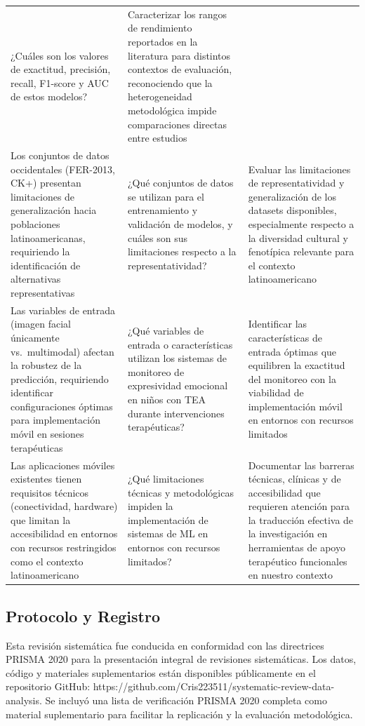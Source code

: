 \documentclass[3p,twocolumn,times]{elsarticle}
\begin{document}
\begin{longtable}{p{4cm} p{6cm} p{5cm}}
		¿Cuáles son los valores de exactitud, precisión, recall, F1-score y AUC de estos modelos? &
		Caracterizar los rangos de rendimiento reportados en la literatura para distintos contextos de evaluación, reconociendo que la heterogeneidad metodológica impide comparaciones directas entre estudios \\[4pt]
		Los conjuntos de datos occidentales (FER-2013, CK+) presentan limitaciones de generalización hacia poblaciones latinoamericanas, requiriendo la identificación de alternativas representativas &
		¿Qué conjuntos de datos se utilizan para el entrenamiento y validación de modelos, y cuáles son sus limitaciones respecto a la representatividad? &
		Evaluar las limitaciones de representatividad y generalización de los datasets disponibles, especialmente respecto a la diversidad cultural y fenotípica relevante para el contexto latinoamericano \\[4pt]
		Las variables de entrada (imagen facial únicamente vs.\ multimodal) afectan la robustez de la predicción, requiriendo identificar configuraciones óptimas para implementación móvil en sesiones terapéuticas &
		¿Qué variables de entrada o características utilizan los sistemas de monitoreo de expresividad emocional en niños con TEA durante intervenciones terapéuticas? &
		Identificar las características de entrada óptimas que equilibren la exactitud del monitoreo con la viabilidad de implementación móvil en entornos con recursos limitados \\[4pt]
		Las aplicaciones móviles existentes tienen requisitos técnicos (conectividad, hardware) que limitan la accesibilidad en entornos con recursos restringidos como el contexto latinoamericano &
		¿Qué limitaciones técnicas y metodológicas impiden la implementación de sistemas de ML en entornos con recursos limitados? &
		Documentar las barreras técnicas, clínicas y de accesibilidad que requieren atención para la traducción efectiva de la investigación en herramientas de apoyo terapéutico funcionales en nuestro contexto \\
	\end{longtable}
	\twocolumn
	
	\subsection{Protocolo y Registro}\label{sec2b}
	
	Esta revisión sistemática fue conducida en conformidad con las directrices PRISMA
	2020 para la presentación integral de revisiones sistemáticas. Los datos, código
	y materiales suplementarios están disponibles públicamente en el repositorio
	GitHub: https://github.com/Cris223511/systematic-review-data-analysis. Se incluyó
	una lista de verificación PRISMA 2020 completa como material suplementario para
	facilitar la replicación y la evaluación metodológica.
	
\end{document}
